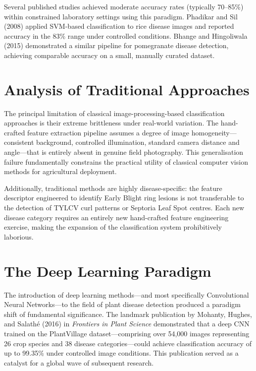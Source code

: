 \documentclass[12pt,a4paper]{report}
\begin{document}
Several published studies achieved moderate accuracy rates (typically 70--85\%) within constrained laboratory settings using this paradigm. Phadikar and Sil (2008) applied SVM-based classification to rice disease images and reported accuracy in the 83\% range under controlled conditions. Bhange and Hingoliwala (2015) demonstrated a similar pipeline for pomegranate disease detection, achieving comparable accuracy on a small, manually curated dataset.

\section{Analysis of Traditional Approaches}

The principal limitation of classical image-processing-based classification approaches is their extreme brittleness under real-world variation. The hand-crafted feature extraction pipeline assumes a degree of image homogeneity---consistent background, controlled illumination, standard camera distance and angle---that is entirely absent in genuine field photography. This generalisation failure fundamentally constrains the practical utility of classical computer vision methods for agricultural deployment.

Additionally, traditional methods are highly disease-specific: the feature descriptor engineered to identify Early Blight ring lesions is not transferable to the detection of TYLCV curl patterns or Septoria Leaf Spot centres. Each new disease category requires an entirely new hand-crafted feature engineering exercise, making the expansion of the classification system prohibitively laborious.

\section{The Deep Learning Paradigm}

The introduction of deep learning methods---and most specifically Convolutional Neural Networks---to the field of plant disease detection produced a paradigm shift of fundamental significance. The landmark publication by Mohanty, Hughes, and Salath\'{e} (2016) in \textit{Frontiers in Plant Science} demonstrated that a deep CNN trained on the PlantVillage dataset---comprising over 54,000 images representing 26 crop species and 38 disease categories---could achieve classification accuracy of up to 99.35\% under controlled image conditions. This publication served as a catalyst for a global wave of subsequent research.
\end{document}
